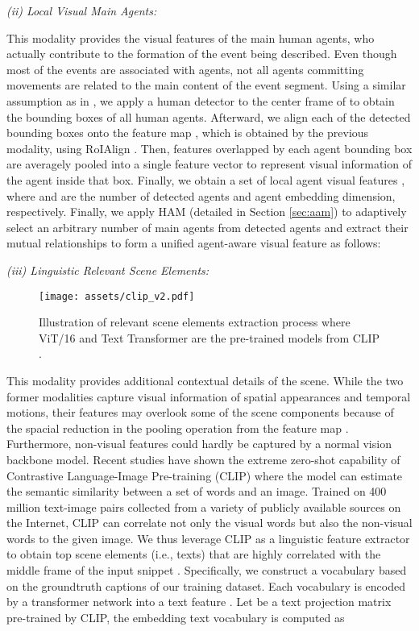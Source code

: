 \documentclass[letterpaper]{article} \usepackage{aaai23}  \usepackage{times}  \usepackage{helvet}  \usepackage{courier}  \usepackage[hyphens]{url}  \usepackage{graphicx} \urlstyle{rm} \def\UrlFont{\rm}  \usepackage{natbib}  \usepackage{caption} \frenchspacing  \setlength{\pdfpagewidth}{8.5in}  \setlength{\pdfpageheight}{11in}  \usepackage{algorithm}
\begin{document}
\noindent
\textit{(ii) Local Visual Main Agents:}

This modality provides the visual features of the main human agents, who actually contribute to the formation of the event being described. Even though most of the events are associated with agents, not all agents committing movements are related to the main content of the event segment.
Using a similar assumption as in \cite{KhoaVo_ICASSP, KhoaVo_Access}, we apply a human detector to the center frame of  to obtain the bounding boxes of all human agents. 
Afterward, we align each of the detected bounding boxes  onto the feature map , which is obtained by the previous modality, using RoIAlign \cite{MaskRCNN_ICCV17}. Then, features overlapped by each agent bounding box are averagely pooled into a single feature vector to represent visual information of the agent inside that box. Finally, we obtain a set of local agent visual features , where  and  are the number of detected agents and agent embedding dimension, respectively.
Finally, we apply HAM (detailed in Section \ref{sec:aam}) to adaptively select an arbitrary number of main agents from  detected agents and extract their mutual relationships to form a unified agent-aware visual feature  as follows:


\noindent
\textit{(iii) Linguistic Relevant Scene Elements:}
\label{sec:ling}

\begin{figure}[t]
\centering
  \texttt{[image: assets/clip\_v2.pdf]}
  \caption{Illustration of relevant scene elements extraction process where ViT/16 and Text Transformer are the pre-trained models from CLIP \cite{radford2021learning}.}\label{fig:lin_feat_v2}
 \vspace{-4mm}
\end{figure}

This modality provides additional contextual details of the scene. 
While the two former modalities capture visual information of spatial appearances and temporal motions, their features may overlook some of the scene components because of the spacial reduction in the pooling operation from the feature map . Furthermore, non-visual features could hardly be captured by a normal vision backbone model. 
Recent studies \cite{Patashnik2021styleclip, Yang2021} have shown the extreme zero-shot capability of Contrastive Language-Image Pre-training (CLIP) where the model can estimate the semantic similarity between a set of words and an image. 
Trained on 400 million text-image pairs collected from a variety of publicly available sources on the Internet, CLIP can correlate not only the visual words but also the non-visual words to the given image.
We thus leverage CLIP as a linguistic feature extractor to obtain top  scene elements (i.e.,  texts) that are highly correlated with the middle frame of the input snippet . 
Specifically, we construct a vocabulary  based on the groundtruth captions of our training dataset. Each vocabulary  is encoded by a transformer network  into a text feature . Let  be a text projection matrix pre-trained by CLIP, the embedding text vocabulary is computed as 
 
\end{document}
